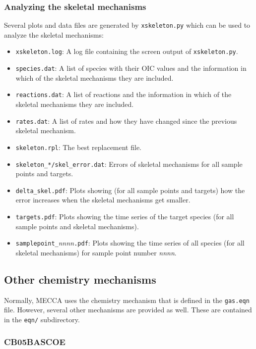 \documentclass[a4paper,twoside]{article}
\begin{document}
\subsubsection{Analyzing the skeletal mechanisms}

Several plots and data files are generated by \verb|xskeleton.py| which
can be used to analyze the skeletal mechanisms:

\begin{itemize}
\item \verb|xskeleton.log|: A log file containing the screen output of
  \verb|xskeleton.py|.
\item \verb|species.dat|: A list of species with their OIC values and
  the information in which of the skeletal mechanisms they are included.
\item \verb|reactions.dat|: A list of reactions and the information in
  which of the skeletal mechanisms they are included.
\item \verb|rates.dat|: A list of rates and how they have changed since
  the previous skeletal mechanism.
\item \verb|skeleton.rpl|: The best replacement file.
\item \verb|skeleton_*/skel_error.dat|: Errors of skeletal mechanisms
  for all sample points and targets.
\item \verb|delta_skel.pdf|: Plots showing (for all sample points and
  targets) how the error increases when the skeletal mechanisms get
  smaller.
\item \verb|targets.pdf|: Plots showing the time series of the target
  species (for all sample points and skeletal mechanisms).
\item \verb|samplepoint_|{\em nnnn}\verb|.pdf|: Plots showing the time
  series of all species (for all skeletal mechanisms) for sample point
  number {\em nnnn}.
\end{itemize}

\subsection{Other chemistry mechanisms}
\label{sec:othereqn}

Normally, MECCA uses the chemistry mechanism that is defined in the
\verb|gas.eqn| file. However, several other mechanisms are provided as
well. These are contained in the \verb|eqn/| subdirectory.

\subsubsection{CB05BASCOE}
\label{sec:cb05bascoe}
\end{document}
